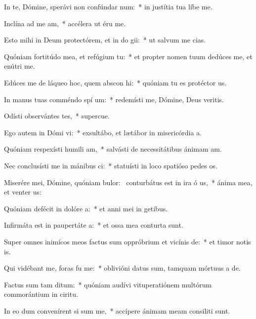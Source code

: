 \item In te, Dómine, sperávi non confúndar  num:~* in justítia tua líbe me.
\item Inclína ad me  am,~* accélera ut éru me.
\item Esto mihi in Deum protectórem, et in do gii:~* ut salvum me cias.
\item Quóniam fortitúdo mea, et refúgium   tu:~* et propter nomen tuum dedúces me, et enútri me.
\item Edúces me de láqueo hoc, quem abscon hi:~* quóniam tu es protéctor us.
\item In manus tuas comméndo spí um:~* redemísti me, Dómine, Deus veritis.
\item Odísti observántes tes,~* supercue.
\item Ego autem in Dómi vi:~* exsultábo, et lætábor in misericórdia a.
\item Quóniam respexísti humili am,~* salvásti de necessitátibus ánimam am.
\item Nec conclusísti me in mánibus ci:~* statuísti in loco spatióso pedes os.
\item Miserére mei, Dómine, quóniam bulor:~\pscross{} conturbátus est in ira ó us,~* ánima mea, et venter us:
\item Quóniam defécit in dolóre  a:~* et anni mei in getibus.
\item Infirmáta est in paupertáte  a:~* et ossa mea conturta sunt.
\item Super omnes inimícos meos factus sum oppróbrium et vicínis  de:~* et timor notis is.
\item Qui vidébant me, foras fu  me:~* oblivióni datus sum, tamquam mórtuus a de.
\item Factus sum tam  ditum:~* quóniam audívi vituperatiónem multórum commorántium in ciritu.
\item In eo dum convenírent si sum me,~* accípere ánimam meam consiliti sunt.
